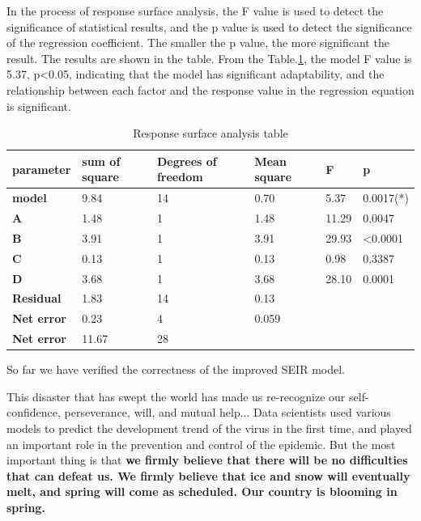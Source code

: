 \documentclass[a4paper, 11pt,twoside=true]{scrartcl}
\begin{document}
\quad In the process of response surface analysis, the F value is used to detect the significance of statistical results, and the p value is used to detect the significance of the regression coefficient. The smaller the p value, the more significant the result. The results are shown in the table. From the Table.\ref{P3T9}, the model F value is 5.37, p<0.05, indicating that the model has significant adaptability, and the relationship between each factor and the response value in the regression equation is significant.

\begin{table}[]
	\centering
	\caption{Response surface analysis table} \label{P3T9}
	\begin{tabular}{llllll}
		\hline
		\textbf{parameter}  & \textbf{sum of square} & \textbf{Degrees of freedom} & \textbf{Mean square} & \textbf{F} & \textbf{p}     \\ \hline
		\textbf{model}  & 9.84         & 14           & 0.70        & 5.37         & 0.0017(*)       \\
		\textbf{A}   & 1.48         & 1            & 1.48        & 11.29        & 0.0047           \\
		\textbf{B}   & 3.91         & 1            & 3.91        & 29.93        & \textless 0.0001 \\
		\textbf{C}   & 0.13         & 1            & 0.13        & 0.98         & 0.3387           \\
		\textbf{D}   & 3.68         & 1            & 3.68        & 28.10        & 0.0001           \\
		\textbf{Residual}  & 1.83         & 14           & 0.13        &              &                  \\
		\textbf{Net error} & 0.23         & 4            & 0.059       &              &                  \\
		\textbf{Net error} & 11.67        & 28           &             &              &                  \\ \hline
	\end{tabular}
\end{table}

\noindent So far we have verified the correctness of the improved SEIR model.

\quad This disaster that has swept the world has made us re-recognize our self-confidence, perseverance, will, and mutual help... Data scientists used various models to predict the development trend of the virus in the first time, and played an important role in the prevention and control of the epidemic. But the most important thing is that \textbf{we firmly believe that there will be no difficulties that can defeat us. We firmly believe that ice and snow will eventually melt, and spring will come as scheduled. Our country is blooming in spring.}
\end{document}
